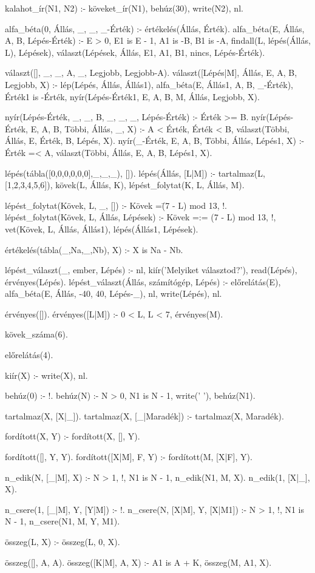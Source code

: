 \begin{program}
kalahot_ír(N1, N2) :-
    köveket_ír(N1), behúz(30),
    write(N2), nl.


alfa_béta(0, Állás, _, _, _-Érték) :-
    értékelés(Állás, Érték).
alfa_béta(E, Állás, A, B, Lépés-Érték) :-
    E > 0, E1 is E - 1,
    A1 is -B, B1 is -A,
    findall(L, lépés(Állás, L), Lépések),
    választ(Lépések, Állás, E1, A1, B1,
            nincs, Lépés-Érték).

választ([], _, _, A, _, Legjobb, Legjobb-A).
választ([Lépés|M], Állás, E, A, B, Legjobb, X) :-
    lép(Lépés, Állás, Állás1),
    alfa_béta(E, Állás1, A, B, _-Érték),
    Érték1 is -Érték,
    nyír(Lépés-Érték1, E, A, B, M, Állás,
         Legjobb, X).

nyír(Lépés-Érték, _, _, B, _, _, _, Lépés-Érték) :-
    Érték >= B.
nyír(Lépés-Érték, E, A, B, Többi, Állás, _, X) :-
    A < Érték, Érték < B,
    választ(Többi, Állás, E, Érték, B, Lépés, X).
nyír(_-Érték, E, A, B, Többi, Állás, Lépés1, X) :-
    Érték =< A,
    választ(Többi, Állás, E, A, B, Lépés1, X).


lépés(tábla([0,0,0,0,0,0],_,_,_), []).
lépés(Állás, [L|M]) :-
    tartalmaz(L, [1,2,3,4,5,6]),
    kövek(L, Állás, K),
    lépést_folytat(K, L, Állás, M).

lépést_folytat(Kövek, L, _, []) :-
    Kövek =\= (7 - L) mod 13, !.
lépést_folytat(Kövek, L, Állás, Lépések) :-
    Kövek =:= (7 - L) mod 13, !,
    vet(Kövek, L, Állás, Állás1),
    lépés(Állás1, Lépések).

értékelés(tábla(_,Na,_,Nb), X) :- X is Na - Nb.

lépést_választ(_, ember, Lépés) :-
    nl, kiír('Melyiket választod?'),
    read(Lépés), érvényes(Lépés).
lépést_választ(Állás, számítógép, Lépés) :-
    előrelátás(E),
    alfa_béta(E, Állás, -40, 40, Lépés-_),
    nl, write(Lépés), nl.

érvényes([]).
érvényes([L|M]) :- 0 < L, L < 7, érvényes(M).


kövek_száma(6).

előrelátás(4).


kiír(X) :- write(X), nl.

behúz(0) :- !.
behúz(N) :-
    N > 0, N1 is N - 1,
    write(' '), behúz(N1).

tartalmaz(X, [X|_]).
tartalmaz(X, [_|Maradék]) :- tartalmaz(X, Maradék).

fordított(X, Y) :- fordított(X, [], Y).

fordított([], Y, Y).
fordított([X|M], F, Y) :- fordított(M, [X|F], Y). 

n_edik(N, [_|M], X) :-
    N > 1, !, N1 is N - 1,
    n_edik(N1, M, X).
n_edik(1, [X|_], X).

n_csere(1, [_|M], Y, [Y|M]) :- !.
n_csere(N, [X|M], Y, [X|M1]) :-
    N > 1, !, N1 is N - 1,
    n_csere(N1, M, Y, M1).

összeg(L, X) :- összeg(L, 0, X).

összeg([], A, A).
összeg([K|M], A, X) :-
    A1 is A + K,
    összeg(M, A1, X).
\end{program}

